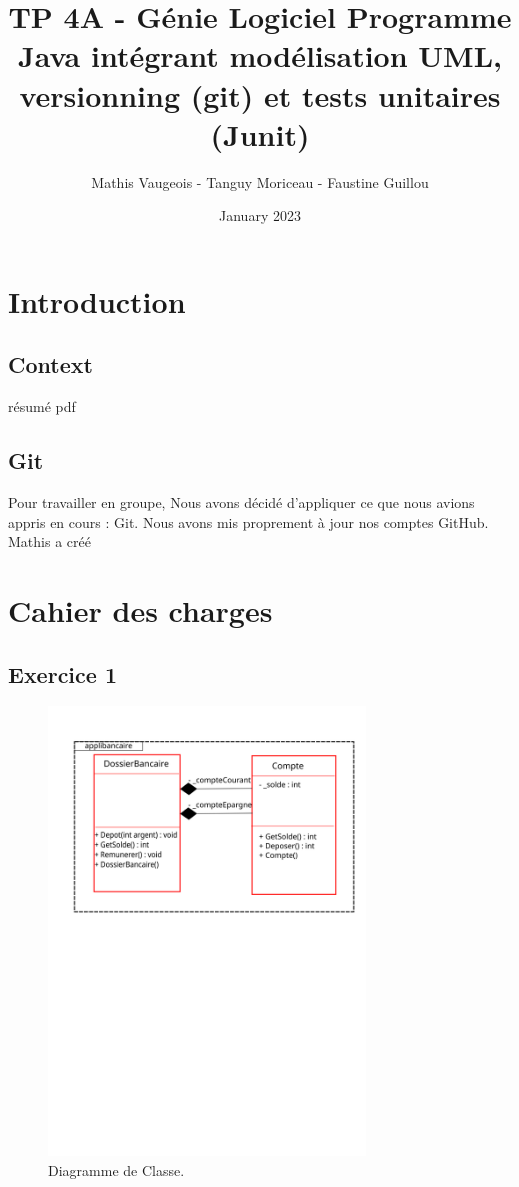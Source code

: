 \documentclass{article}
\title{TP 4A - Génie Logiciel
Programme Java intégrant modélisation UML, versionning (git)
et tests unitaires (Junit)
}
\author{Mathis Vaugeois - Tanguy Moriceau - Faustine Guillou}
\date{January 2023}
\begin{document}
\maketitle
\tableofcontents

\newpage
\section{Introduction}
\subsection{Context}
résumé pdf
\subsection{Git}
Pour travailler en groupe, Nous avons décidé d'appliquer ce que nous avions appris en cours : Git. Nous avons mis proprement à jour nos comptes GitHub. Mathis a créé
\newpage
\section{Cahier des charges}
\subsection{Exercice 1}

\begin{figure}
    \centering
    \includegraphics[width=0.75\textwidth]{diagrammeClasse}
    \caption{Diagramme de Classe.}
    \label{fig:mesh1}
\end{figure}
\end{document}

